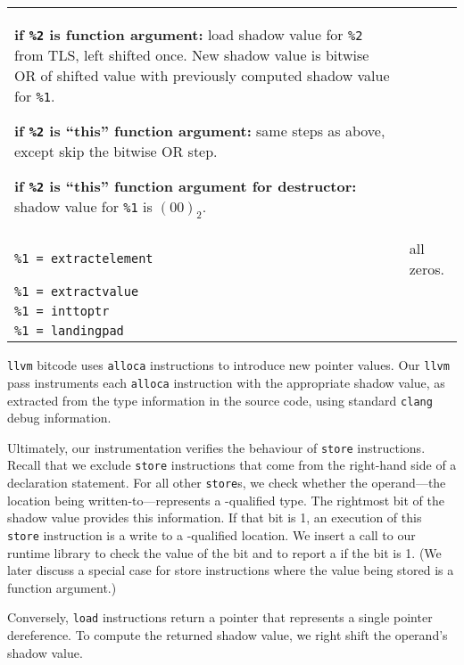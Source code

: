 \begin{table}[!b]
\begin{tabular}{l p{8cm}}
      \textbf{if \texttt{\%2} is function argument:} load shadow value for
      \texttt{\%2} from TLS, left shifted once. New shadow value is bitwise OR
      of shifted value with previously computed shadow value for \texttt{\%1}.

      \textbf{if \texttt{\%2} is ``this'' function argument:} same steps as
      above, except skip the bitwise OR step.

      \textbf{if \texttt{\%2} is ``this'' function argument for destructor:} shadow
      value for \texttt{\%1} is $(00)_2$.
      \\[0.5em]
    \texttt{\%1 = extractelement}
       &
       all zeros.\\
    \texttt{\%1 = extractvalue}\\
    \texttt{\%1 = inttoptr} \\
    \texttt{\%1 = landingpad}
      \newline
      \\
  \end{tabular}
\end{table}

\texttt{llvm} bitcode uses \texttt{alloca} instructions to introduce new pointer
values.
Our \texttt{llvm} pass instruments each \texttt{alloca} instruction with the
appropriate shadow value, as extracted from the type information in the source
code, using standard \texttt{clang} debug information.

Ultimately, our instrumentation verifies the behaviour of \texttt{store}
instructions.
Recall that we exclude \texttt{store} instructions that come from the right-hand
side of a declaration statement.
For all other \texttt{store}s, we check whether the operand---the location being
written-to---represents a \const{}-qualified type.
The rightmost bit of the shadow value provides this information.
If that bit is 1, an execution of this \texttt{store} instruction is a write to
a \const{}-qualified location.
We insert a call to our runtime library to check the value of the bit and to
report a \wtc{} if the bit is 1.
(We later discuss a special case for store instructions where the value being
stored is a function argument.)

Conversely, \texttt{load} instructions return a pointer that represents a single
pointer dereference.
To compute the returned shadow value, we right shift the operand's shadow value.

